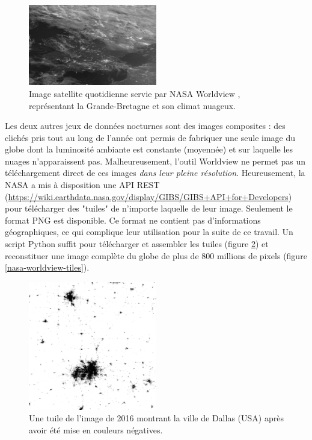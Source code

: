 \documentclass[a4paper, 11pt]{report}
\begin{document}
\begin{figure}[h]
	\centering
	\includegraphics[width=0.5\textwidth]{img/worldview_clouds.JPG}
	\caption{Image satellite quotidienne servie par NASA Worldview \cite{nasa-worldview}, représentant la Grande-Bretagne et son climat nuageux.}
	\label{nasa-worldview-daily}
\end{figure}

Les deux autres jeux de données nocturnes sont des images composites : des clichés pris tout au long de l'année ont permis de fabriquer une seule image du globe dont la luminosité ambiante est constante (moyennée) et sur laquelle les nuages n'apparaissent pas. Malheureusement, l'outil Worldview ne permet pas un téléchargement direct de ces images \textit{dans leur pleine résolution}. Heureusement, la NASA a mis à disposition une API REST (\url{https://wiki.earthdata.nasa.gov/display/GIBS/GIBS+API+for+Developers}) pour télécharger des "tuiles" de n'importe laquelle de leur image. Seulement le format PNG est disponible. Ce format ne contient pas d'informations géographiques, ce qui complique leur utilisation pour la suite de ce travail. Un script Python suffit pour télécharger et assembler les tuiles (figure \ref{nasa-worldview-tile}) et reconstituer une image complète du globe de plus de 800 millions de pixels (figure \ref{nasa-worldview-tiles}).

\begin{figure}[h]
	\centering
	\includegraphics[width=0.5\textwidth]{img/018-012.png}
	\caption{Une tuile de l'image de 2016 montrant la ville de Dallas (USA) après avoir été mise en couleurs négatives.}
	\label{nasa-worldview-tile}
\end{figure}
\end{document}
